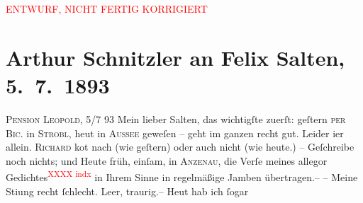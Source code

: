 
\begin{center}
            \textcolor{red}{ENTWURF, NICHT FERTIG KORRIGIERT}
                      \end{center}
            
         
         \renewcommand{\erwaehntePersonen}{Personen: Richard Beer-Hofmann, Paul Horn, Josef Jarno, Felix Salten, Richard Specht, Ignaz Wild, Grethe Wreden}
         \renewcommand{\erwaehnteOrte}{Orte: Anzenau, Bad Aussee, Bad Ischl, Hotel und Pension Rudolfshöhe (Leopold Petter), Salzburg, Strobl, Wien}
         \renewcommand{\erwaehnteWerke}{Werke: Abschiedssouper, Das Märchen. Schauspiel in drei Aufzügen, Die Frage an das Schicksal}
               \section[Arthur Schnitzler an Felix Salten, 5. 7. 1893]{ Arthur Schnitzler an Felix Salten, 5. 7. 1893}\nopagebreak{}\rehead{ }\begin{ledgroupsized}[t]{13cm}\normalsize\beginnumbering \toendnotes[C]{\smallbreak\pagebreak[2]} 
\toendnotes[C]{\smallbreak}\pstart
           \raggedleft{}{\pb}\textsc{Pension Leopold}, 5/7 93\pend
           \pstart{}Mein lieber Salten,\pend\pstart
           das wichtigſte zuerſt: geſtern \textsc{per}{ }\textsc{Bic.} in \textsc{Strobl}, heut in \textsc{Aussee} geweſen – geht im ganzen recht gut. Leider i{\geminationm}er
               allein. \textsc{Richard} ko{\geminationm}t nach (wie geſtern) oder auch nicht (wie
               heute.) – Geſchreibe noch nichts; und {\pb}Heute
               früh, einſam, in \textsc{Anzenau}, die Verſe meines allegor
                  Gedichtes\textcolor{red}{\textsuperscript{XXXX indx}} in Ihrem Sinne in regelmäßige Jamben übertragen.– – Meine Sti{\geminationm}ung recht ſchlecht. Leer, traurig.– Heut hab ich ſogar

\end{ledgroupsized}
